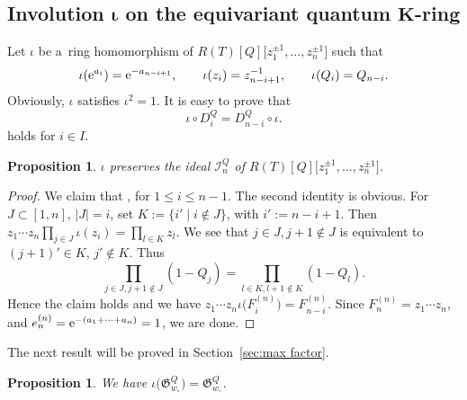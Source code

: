\documentclass[pdftex]{sigma}
\numberwithin{equation}{section}
\newcommand{\Rep}{{R(T)}}
\newtheorem{Proposition}[Theorem]{Proposition}
\theoremstyle{definition}
\begin{document}
\subsection[Involution iota on the equivariant quantum K-ring]{Involution $\boldsymbol{\iota}$ on the equivariant quantum $\boldsymbol{K}$-ring}

Let $\iota$ be a~ring homomorphism of
$\Rep[Q]\big[z_1^{\pm 1},\dots,z_n^{\pm 1}\big]$
such that
\[
\iota({\rm e}^{a_i})={\rm e}^{-a_{n-i+1}},\qquad
\iota(z_{i})=z_{n-i+1}^{-1},\qquad
\iota(Q_i)=Q_{n-i}.
\]
Obviously,
$\iota$ satisfies $\iota^2=1$.
It is easy to prove that
\begin{equation}\label{eq:S_and_D_i}
 \iota\circ D_i^Q=D_{n-i}^Q\circ \iota.
 \end{equation}
 holds for $i\in I$.
\begin{Proposition}
$\iota$ preserves the ideal $\mathscr{I}_n^Q$ of $\Rep[Q]\big[z_1^{\pm 1},\dots,z_n^{\pm 1}\big]$.
\end{Proposition}
\begin{proof}
We claim that
, 
for $1\le i\le n-1$.
The second identity is obvious.
For $J\subset [1,n]$, $ |J|=i$, set
$K:=\{i'\mid i\notin J\}$, with $i':=n-i+1$. Then
$z_1\cdots z_n \prod_{j\in J}\iota(z_i)=\prod_{l\in K}z_l$.
We see that $j\in J, j+1\notin J$
is equivalent to
$(j+1)'\in K$, $j'\notin K$.
Thus
\[
\prod_{j\in J, j+1\notin J}
(1-Q_j)=
\prod_{l\in K, l+1\notin K}
(1-Q_l).
\]
Hence the claim holds and we have $z_1\cdots z_n \iota\bigl(F_i^{(n)}\bigr)=F_{n-i}^{(n)}$.
Since $F_n^{(n)}=z_1\cdots z_n$, and $e_n^{(n)}={\rm e}^{-(a_1+\cdots+a_n)}=1$, we are done.
\end{proof}

The next result will be proved in Section~\ref{sec:max factor}.
\begin{Proposition}\label{prop:long_iota_invariant}
We have $\iota\bigl(\mathfrak{G}_{w_\circ}^{Q}\bigr)=\mathfrak{G}_{w_\circ}^{Q}$.
\end{Proposition}
\end{document}
